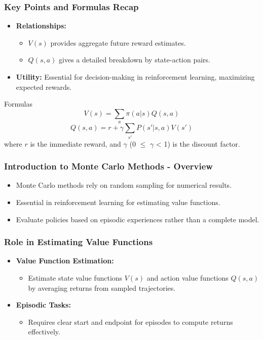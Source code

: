\documentclass[aspectratio=169]{beamer}
\begin{document}
\begin{frame}[fragile]
    \frametitle{Key Points and Formulas Recap}
    \begin{itemize}
        \item \textbf{Relationships:}
        \begin{itemize}
            \item \(V(s)\) provides aggregate future reward estimates.
            \item \(Q(s, a)\) gives a detailed breakdown by state-action pairs.
        \end{itemize}
        \item \textbf{Utility:} Essential for decision-making in reinforcement learning, maximizing expected rewards.
    \end{itemize}
    
    \begin{block}{Formulas}
        \begin{equation}
        V(s) = \sum_{a} \pi(a|s) Q(s,a)
        \end{equation}
        \begin{equation}
        Q(s, a) = r + \gamma \sum_{s'} P(s'|s,a) V(s')
        \end{equation}
        where \(r\) is the immediate reward, and \(\gamma\) (0 \(\leq\) \(\gamma\) < 1) is the discount factor.
    \end{block}
\end{frame}

\begin{frame}[fragile]
  \frametitle{Introduction to Monte Carlo Methods - Overview}
  \begin{itemize}
    \item Monte Carlo methods rely on random sampling for numerical results.
    \item Essential in reinforcement learning for estimating value functions.
    \item Evaluate policies based on episodic experiences rather than a complete model.
  \end{itemize}
\end{frame}

\begin{frame}[fragile]
  \frametitle{Role in Estimating Value Functions}
  \begin{itemize}
    \item \textbf{Value Function Estimation:} 
    \begin{itemize}
      \item Estimate state value functions \( V(s) \) and action value functions \( Q(s, a) \) by averaging returns from sampled trajectories.
    \end{itemize}
    \item \textbf{Episodic Tasks:} 
    \begin{itemize}
      \item Requires clear start and endpoint for episodes to compute returns effectively.
    \end{itemize}
  \end{itemize}
\end{frame}
\end{document}
